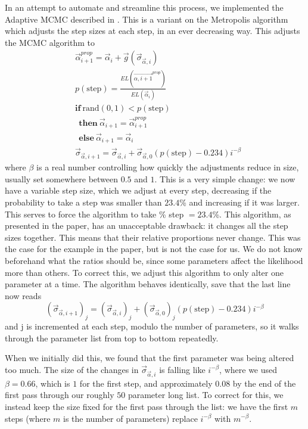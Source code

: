 In an attempt to automate and streamline this process, we implemented
the Adaptive MCMC described in \cite{DynamicStepPaper}.  This is a
variant on the Metropolis algorithm which adjusts the step sizes
at each step, in an ever decreasing way.  This adjusts the MCMC
algorithm to
\begin{equation*}
\begin{split}
& \vec{\alpha}_{i+1}^{prop} = \vec{\alpha}_i + 
\vec{g}(\vec{\sigma}_{\vec{\alpha},i})\\
& p(\mathrm{step}) = \frac{EL(\vec{\alpha,i+1}^{prop})}
{EL(\vec{\alpha}_i)}\\
& \mathbf{if}\ \mathrm{rand}(0,1) < p(\mathrm{step})\\
& \ \ \mathbf{then}\ \vec{\alpha}_{i+1} = \vec{\alpha}_{i+1}^{prop}\\
& \ \ \mathbf{else}\ \vec{\alpha}_{i+1} = \vec{\alpha}_i\\
& \vec{\sigma}_{\vec{\alpha},i+1} = \vec{\sigma}_{\vec{\alpha},i} + 
\vec{\sigma}_{\vec{\alpha},0} (p(\mathrm{step})-0.234) i^{-\beta}
\end{split}
\end{equation*}
where $\beta$ is a real number controlling how quickly the adjustments
reduce in size, usually set somewhere between $0.5$ and $1$.  This is
a very simple change: we now have a variable step size, which we
adjust at every step, decreasing if the probability to take a step was
smaller than $23.4$\% and increasing if it was larger.  This serves to
force the algorithm to take \% step $=23.4$\%.  This algorithm, as
presented in the paper, has an unacceptable drawback: it changes all
the step sizes together.  This means that their relative proportions
never change.  This was the case for the example in the paper, but is
not the case for us.  We do not know beforehand what the ratios should
be, since some parameters affect the likelihood more than others.  To
correct this, we adjust this algorithm to only alter one parameter at
a time.  The algorithm behaves identically, save that the last line
now reads
\begin{equation*}
(\vec{\sigma}_{\vec{\alpha},i+1})_j =
(\vec{\sigma}_{\vec{\alpha},i})_j + (\vec{\sigma}_{\vec{\alpha},0})_j
(p(\mathrm{step})-0.234) i^{-\beta}
\end{equation*}
and j is incremented at each step, modulo the number of parameters, so
it walks through the parameter list from top to bottom repeatedly.

When we initially did this, we found that the first parameter was
being altered too much.  The size of the changes in
$\vec{\sigma}_{\vec{\alpha},i}$ is falling like $i^{-\beta}$, where we
used $\beta = 0.66$, which is $1$ for the first step, and
approximately $0.08$ by the end of the first pass through our roughly
$50$ parameter long list.  To correct for this, we instead keep the
size fixed for the first pass through the list: we have the first $m$
steps (where $m$ is the number of parameters) replace $i^{-\beta}$
with $m^{-\beta}$.

